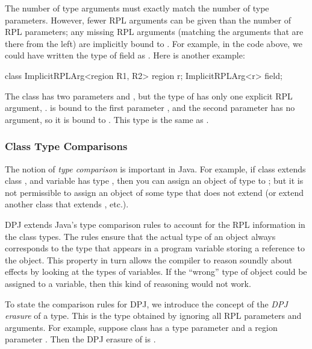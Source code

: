 The number of type arguments must exactly match the number of type
parameters.  However, fewer RPL arguments can be given than the number
of RPL parameters; any missing RPL arguments (matching the arguments
that are there from the left) are implicitly bound to .  For
example, in the code above, we could have written the type of field
 as .  Here is another example:
%
\begin{dpjlisting}
class ImplicitRPLArg<region R1, R2> {
  region r;
  ImplicitRPLArg<r> field;
}
\end{dpjlisting}
%
The class  has two parameters  and
, but the type  of  has only
one explicit RPL argument, .   is bound to the first
parameter , and the second parameter has no argument, so it is
bound to .  This type is the same as
.

\subsubsection{Class Type Comparisons%
\label{sec:types:class:compare}}

The notion of \emph{type comparison} is important in Java.  For
example, if class  extends class , and variable 
has type , then you can assign an object of type  to
; but it is not permissible to assign an object of some type
 that does not extend  (or extend another class that
extends , etc.).

DPJ extends Java's type comparison rules to account for the RPL
information in the class types.  The rules ensure that the actual type
of an object always corresponds to the type that appears in a program
variable storing a reference to the object.  This property in turn
allows the compiler to reason soundly about effects by looking at the
types of variables.  If the ``wrong'' type of object could be assigned
to a variable, then this kind of reasoning would not work.

To state the comparison rules for DPJ, we introduce the concept of the
\emph{DPJ erasure} of a type.  This is the type obtained by ignoring
all RPL parameters and arguments.  For example, suppose class 
has a type parameter  and a region parameter .  Then the
DPJ erasure of  is .

